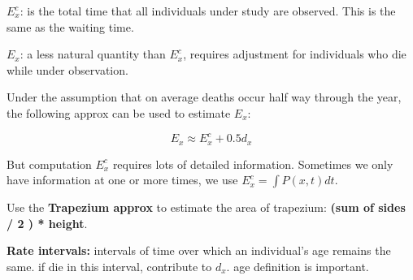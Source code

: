 \documentclass[a4paper]{article}
\begin{document}
$E^c_x$: is the total time that all individuals under study are observed. This is the same as the waiting time.

$E_x$: a less natural quantity than $E^c_x$, requires adjustment for individuals who die while under observation.

Under the assumption that on average deaths occur half way through the year, the following approx can be used to estimate $E_x$:

$$E_x\approx E_x^c+0.5d_x$$

But computation $E_x^c$ requires lots of detailed information. Sometimes we only have information at one or more times, we use $E_x^c=\int P(x,t)dt$.

Use the \textbf{Trapezium approx} to estimate the area of trapezium: \textbf{(sum of sides / 2 ) * height}.

\textbf{Rate intervals:} intervals of time over which an individual's age remains the same. if die in this interval, contribute to $d_x$. age definition is important. 
\end{document}

